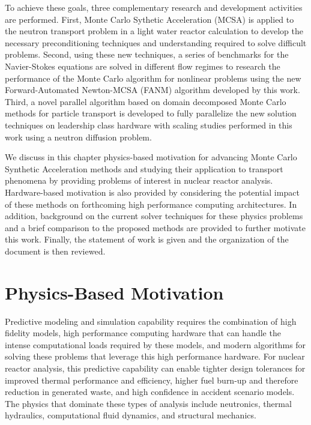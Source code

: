 To achieve these goals, three complementary research and development
activities are performed. First, Monte Carlo Sythetic Acceleration
(MCSA) is applied to the neutron transport problem in a light water
reactor calculation to develop the necessary preconditioning
techniques and understanding required to solve difficult
problems. Second, using these new techniques, a series of benchmarks
for the Navier-Stokes equations are solved in different flow regimes
to research the performance of the Monte Carlo algorithm for nonlinear
problems using the new Forward-Automated Newton-MCSA (FANM) algorithm
developed by this work. Third, a novel parallel algorithm based on
domain decomposed Monte Carlo methods for particle transport is
developed to fully parallelize the new solution techniques on
leadership class hardware with scaling studies performed in this work
using a neutron diffusion problem.

We discuss in this chapter physics-based motivation for advancing
Monte Carlo Synthetic Acceleration methods and studying their
application to transport phenomena by providing problems of interest
in nuclear reactor analysis. Hardware-based motivation is also
provided by considering the potential impact of these methods on
forthcoming high performance computing architectures. In addition,
background on the current solver techniques for these physics problems
and a brief comparison to the proposed methods are provided to further
motivate this work. Finally, the statement of work is given and the
organization of the document is then reviewed.

\section{Physics-Based Motivation}
\label{sec:physics_motivation}
Predictive modeling and simulation capability requires the combination
of high fidelity models, high performance computing hardware that can
handle the intense computational loads required by these models, and
modern algorithms for solving these problems that leverage this high
performance hardware. For nuclear reactor analysis, this predictive
capability can enable tighter design tolerances for improved thermal
performance and efficiency, higher fuel burn-up and therefore
reduction in generated waste, and high confidence in accident scenario
models. The physics that dominate these types of analysis include
neutronics, thermal hydraulics, computational fluid dynamics, and
structural mechanics.

